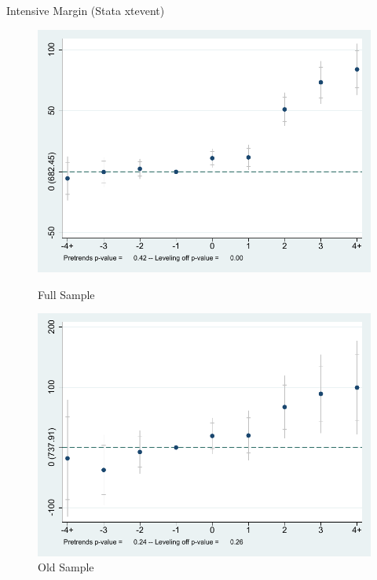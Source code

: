 \documentclass[10pt]{beamer}
\begin{document}
\begin{frame}{Intensive Margin (Stata xtevent)}
\begin{figure}[ht]
        \begin{minipage}[b]{0.47\linewidth}
            \centering
            \includegraphics[width=\textwidth]{Objects/xtevent_fullsample.pdf}
            \caption{Full Sample}
            \label{fig:a}
        \end{minipage}
        \hspace{0.2cm}
        \begin{minipage}[b]{0.47\linewidth}
            \centering
            \includegraphics[width=\textwidth]{Objects/xtevent_oldsample.pdf}
            \caption{Old Sample}
            \label{fig:b}
        \end{minipage}
    \end{figure}
\end{frame}
\end{document}

